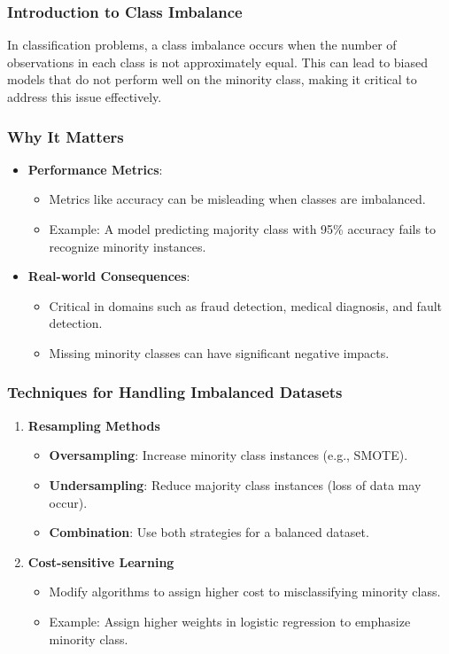 \documentclass[aspectratio=169]{beamer}
\begin{document}
\begin{frame}[fragile]
    \frametitle{Introduction to Class Imbalance}
    In classification problems, a class imbalance occurs when the number of observations in each class is not approximately equal. 
    This can lead to biased models that do not perform well on the minority class, making it critical to address this issue effectively.
\end{frame}

\begin{frame}[fragile]
    \frametitle{Why It Matters}
    \begin{itemize}
        \item \textbf{Performance Metrics}: 
            \begin{itemize}
                \item Metrics like accuracy can be misleading when classes are imbalanced.
                \item Example: A model predicting majority class with 95\% accuracy fails to recognize minority instances.
            \end{itemize}
        \item \textbf{Real-world Consequences}:
            \begin{itemize}
                \item Critical in domains such as fraud detection, medical diagnosis, and fault detection.
                \item Missing minority classes can have significant negative impacts.
            \end{itemize}
    \end{itemize}
\end{frame}

\begin{frame}[fragile]
    \frametitle{Techniques for Handling Imbalanced Datasets}
    \begin{enumerate}
        \item \textbf{Resampling Methods}
            \begin{itemize}
                \item \textbf{Oversampling}: Increase minority class instances (e.g., SMOTE).
                \item \textbf{Undersampling}: Reduce majority class instances (loss of data may occur).
                \item \textbf{Combination}: Use both strategies for a balanced dataset.
            \end{itemize}
        \item \textbf{Cost-sensitive Learning}
            \begin{itemize}
                \item Modify algorithms to assign higher cost to misclassifying minority class.
                \item Example: Assign higher weights in logistic regression to emphasize minority class.
            \end{itemize}
    \end{enumerate}
\end{frame}
\end{document}
